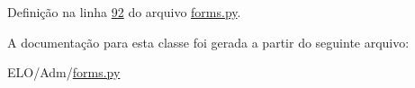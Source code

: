 Definição na linha \hyperlink{Adm_2forms_8py_source_l00092}{92} do arquivo \hyperlink{Adm_2forms_8py_source}{forms.\-py}.



A documentação para esta classe foi gerada a partir do seguinte arquivo\-:\begin{DoxyCompactItemize}
\item 
E\-L\-O/\-Adm/\hyperlink{Adm_2forms_8py}{forms.\-py}\end{DoxyCompactItemize}
